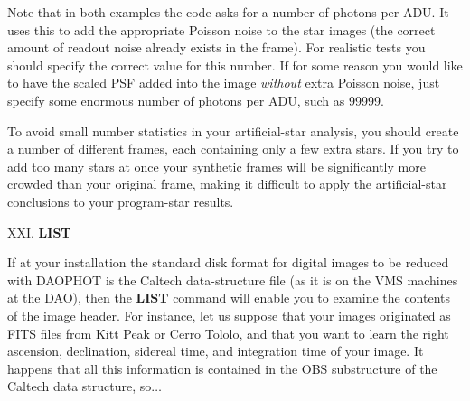 Note that in both examples the code asks for a number of photons per
ADU.  It uses this to add the appropriate Poisson noise to the star
images (the correct amount of readout noise already exists in the
frame).  For realistic tests you should specify the correct value for
this number.  If for some reason you would like to have the scaled PSF
added into the image {\it without\/} extra Poisson noise, just specify
some enormous number of photons per ADU, such as 99999.

     To avoid small number statistics in your artificial-star analysis,
you should create a number of different frames, each containing only a
few extra stars.  If you try to add too many stars at once your
synthetic frames will be significantly more crowded than your original
frame, making it difficult to apply the artificial-star conclusions to
your program-star results. 

\vfill
\eject
\noindent XXI.  {\bf LIST}

If at your installation the standard disk format for digital images to
be reduced with DAOPHOT is the Caltech data-structure file (as it is on
the VMS machines at the DAO), then the {\bf LIST} command will enable
you to examine the contents of the image header.  For instance, let us
suppose that your images originated as FITS files from Kitt Peak or
Cerro Tololo, and that you want to learn the right ascension,
declination, sidereal time, and integration time of your image.  It
happens that all this information is contained in the OBS substructure
of the Caltech data structure, so$\ldots$

